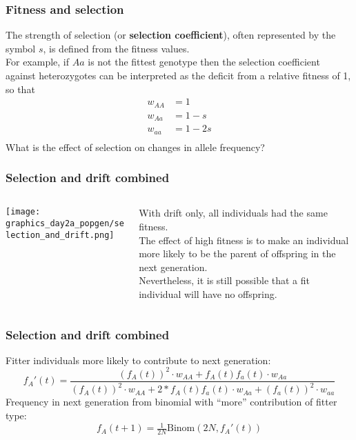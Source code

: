 \documentclass{beamer}
\newcommand{\1}{\ensuremath{\mathbf{1}}}
\begin{document}
%
%
%
\begin{frame}\frametitle{Fitness and selection}
	The strength of selection (or \textbf{selection coefficient}), often represented by the symbol $s$, is defined from the fitness values.\\[2ex]
	For example, if $Aa$ is not the fittest genotype then the selection coefficient against heterozygotes can be interpreted as the deficit from a relative fitness of 1, so that
	\begin{equation}
		\begin{split}
			w_{AA} & = 1\\
			w_{Aa} & = 1-s\\
			w_{aa} & = 1-2s\\
		\end{split}
	\end{equation}
	What is the effect of selection on changes in allele frequency?
\end{frame}
%
%
%
\begin{frame}\frametitle{Selection and drift combined}
	\begin{columns}
	\begin{column}{.5\textwidth}
		\begin{center}
			\texttt{[image: graphics\_day2a\_popgen/selection\_and\_drift.png]}
		\end{center}		
	\end{column}
	\begin{column}{.5\textwidth}
		With drift only, all individuals had the same fitness.\\[1.5ex]
		The effect of high fitness is to make an individual more likely to be the parent of offspring in the next generation.\\[1.5ex]
		Nevertheless, it is still possible that a fit individual will have no offspring.
	\end{column}
	\end{columns}
\end{frame}
%
%
%
\begin{frame}\frametitle{Selection and drift combined}
	Fitter individuals more likely to contribute to next generation:
	\begin{equation}
		f_A'(t) = \frac{(f_A(t))^2 \cdot w_{AA} + f_A(t)f_a(t) \cdot w_{Aa}}{(f_A(t))^2 \cdot w_{AA} + 2 * f_A(t)f_a(t) \cdot w_{Aa} + (f_a(t))^2 \cdot w_{aa}}
	\end{equation}
	Frequency in next generation from binomial with ``more'' contribution of fitter type:
	\begin{equation}
		f_A(t+1) = \tfrac{1}{2N} \text{Binom}(2N, f_A'(t))
	\end{equation}
\end{frame}
\end{document}
